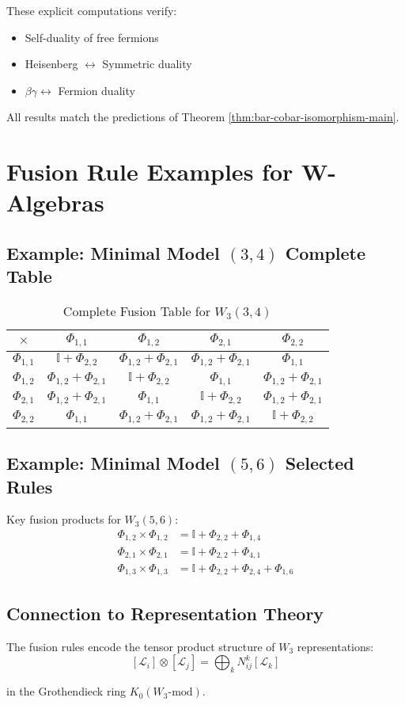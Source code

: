 These explicit computations verify:
\begin{itemize}
\item Self-duality of free fermions
\item Heisenberg $\leftrightarrow$ Symmetric duality
\item $\beta\gamma \leftrightarrow$ Fermion duality
\end{itemize}

All results match the predictions of Theorem \ref{thm:bar-cobar-isomorphism-main}.





\section{Fusion Rule Examples for W-Algebras}
\label{sec:fusion-examples}

\subsection{Example: Minimal Model $(3,4)$ Complete Table}

\begin{table}[h]
\centering
\caption{Complete Fusion Table for $W_3(3,4)$}
\begin{tabular}{|c||c|c|c|c|}
\hline
$\times$ & $\Phi_{1,1}$ & $\Phi_{1,2}$ & $\Phi_{2,1}$ & $\Phi_{2,2}$ \\
\hline\hline
$\Phi_{1,1}$ & $\mathbb{I} + \Phi_{2,2}$ & $\Phi_{1,2} + \Phi_{2,1}$ & 
$\Phi_{1,2} + \Phi_{2,1}$ & $\Phi_{1,1}$ \\
\hline
$\Phi_{1,2}$ & $\Phi_{1,2} + \Phi_{2,1}$ & $\mathbb{I} + \Phi_{2,2}$ & 
$\Phi_{1,1}$ & $\Phi_{1,2} + \Phi_{2,1}$ \\
\hline
$\Phi_{2,1}$ & $\Phi_{1,2} + \Phi_{2,1}$ & $\Phi_{1,1}$ & 
$\mathbb{I} + \Phi_{2,2}$ & $\Phi_{1,2} + \Phi_{2,1}$ \\
\hline
$\Phi_{2,2}$ & $\Phi_{1,1}$ & $\Phi_{1,2} + \Phi_{2,1}$ & 
$\Phi_{1,2} + \Phi_{2,1}$ & $\mathbb{I} + \Phi_{2,2}$ \\
\hline
\end{tabular}
\end{table}

\subsection{Example: Minimal Model $(5,6)$ Selected Rules}

Key fusion products for $W_3(5,6)$:
\begin{align}
\Phi_{1,2} \times \Phi_{1,2} &= \mathbb{I} + \Phi_{2,2} + \Phi_{1,4} \\
\Phi_{2,1} \times \Phi_{2,1} &= \mathbb{I} + \Phi_{2,2} + \Phi_{4,1} \\
\Phi_{1,3} \times \Phi_{1,3} &= \mathbb{I} + \Phi_{2,2} + \Phi_{2,4} + \Phi_{1,6}
\end{align}

\subsection{Connection to Representation Theory}

The fusion rules encode the tensor product structure of $W_3$ representations:
$$[\mathcal{L}_i] \otimes [\mathcal{L}_j] = \bigoplus_k N_{ij}^k [\mathcal{L}_k]$$

in the Grothendieck ring $K_0(W_3\text{-mod})$.

